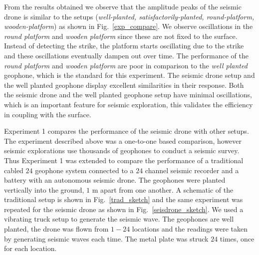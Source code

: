 From the results obtained we observe that the amplitude peaks of the seismic drone is similar to the setups (\emph{well-planted, satisfactorily-planted, round-platform, wooden-platform}) as shown in Fig.~\ref{exp_compare}. We observe oscillations in the \emph{round platform} and \emph{wooden platform} since these are not fixed to the surface. Instead of detecting the strike, the platform starts oscillating due to the strike and these oscillations eventually dampen out over time. The performance of the \emph{round platform} and \emph{wooden platform} are poor in comparison to the \emph{well planted} geophone, which is the standard for this experiment. The seismic drone setup and the well planted geophone display excellent similarities in their response. Both the seismic drone and the well planted geophone setup have minimal oscillations, which is an important feature for seismic exploration, this validates the efficiency in coupling with the surface.  

Experiment 1 compares the performance of the seismic drone with other setups. The experiment described above was a one-to-one based comparison, however seismic explorations use thousands of geophones to conduct a seismic survey. Thus Experiment 1 was extended to compare the performance of a traditional cabled $24$ geophone system connected to a $24$ channel seismic recorder and a battery with an autonomous seismic drone. The geophones were planted vertically into the ground, $1$ m apart from one another.  A schematic of the traditional setup is shown in Fig.~\ref{trad_sketch} and the same experiment was repeated for the seismic drone as shown in Fig.~\ref{seisdrone_sketch}. We used a vibrating truck setup to generate the seismic wave. The geophones are well planted, the drone was flown from $1-24$ locations and the readings were taken by generating seismic waves each time. The metal plate was struck $24$ times, once for each location.

